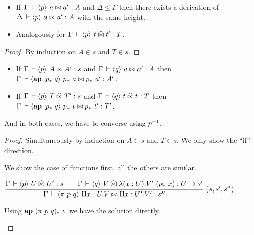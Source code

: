 \documentclass[a4paper,english]{lipics-utf8x}
\begin{document}
  \begin{lemma}[Weakening]
    \leavevmode
    \begin{itemize}
      \item If $\Gamma \,\vdash \langle p \rangle~ a \mathrel{\bowtie} a' : A$ and $\Delta \le \Gamma$ then
      there exists a derivation of $\Delta \,\vdash \langle p \rangle~ a \mathrel{\bowtie} a' : A$ with the
      same height.
      \item Analogously for $\Gamma \,\vdash \langle p \rangle~ t \mathrel{\widehat{\bowtie}} t' : T$.
    \end{itemize}
  \end{lemma}
  \begin{proof}
    By induction on $A \in s$ and $T \in s$.
  \end{proof}

  \begin{lemma}
    \label{lem:s-conv}
    \leavevmode
    \begin{itemize}
      \item If $\Gamma \,\vdash \langle p \rangle~ A \mathrel{\bowtie} A' : s$ and
      $\Gamma \,\vdash \langle q \rangle~ a \mathrel{\bowtie} a' : A$ then
      $\Gamma \der \hideq{\ap p_*\ q} p_*\ a \Er p_*\ a' : A'$.
      \item If $\Gamma \,\vdash \langle p \rangle~ T \mathrel{\widehat{\bowtie}} T' : s$ and
      $\Gamma \,\vdash \langle q \rangle~ t \mathrel{\widehat{\bowtie}} t : T$ then
      $\Gamma \der \hideq{\ap p_*\ q} p_*\ t \Er p_*\ t' : T'$.
    \end{itemize}
    And in both cases, we have to converse using $p^{-1}$.
  \end{lemma}

  \begin{proof}
    Simultaneously by induction on $A \in s$ and $T \in s$.
    We only show the ``if'' direction.

    We show the case of functions first, all the others are similar.

    \begin{caselist}
      \nextcase
      \begin{center}
      \(
        \rux{\Gamma \der \hideq{p} U \hEr U' : s \qquad
              \Gamma \der \hideq{q} V \hEr \lambda (x:U). V'\ (p_*\ x) : U \to s'
            }{\Gamma \der \hideq{\pi\ p\ q} \Pi x:U.V \Er \Pi x:U'.V' : s''
            }{(s,s',s'')}
      \)
      \end{center}
      \begin{mathc}
      \end{mathc}
      Using $\operatorname{\mathbf{ap}~} (\pi\ p\ q)_*\ e$ we have the solution directly.
    \end{caselist}
  \end{proof}
\end{document}
